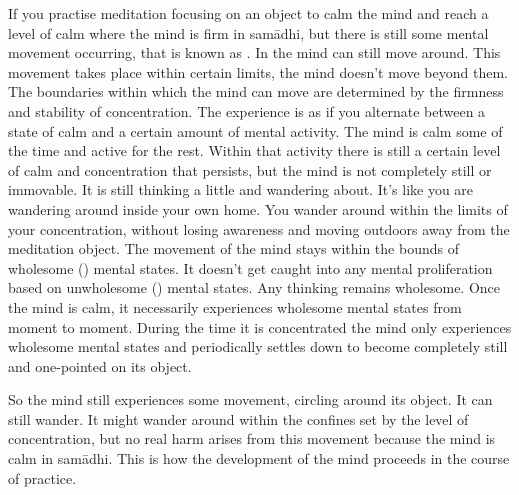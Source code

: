 If you practise meditation focusing on an object to calm the mind and reach a level of calm where the mind is firm in sam\=adhi, but there is still some mental movement occurring, that is known as . In  the mind can still move around. This movement takes place within certain limits, the mind doesn't move beyond them. The boundaries within which the mind can move are determined by the firmness and stability of concentration. The experience is as if you alternate between a state of calm and a certain amount of mental activity. The mind is calm some of the time and active for the rest. Within that activity there is still a certain level of calm and concentration that persists, but the mind is not completely still or immovable. It is still thinking a little and wandering about. It's like you are wandering around inside your own home. You wander around within the limits of your concentration, without losing awareness and moving outdoors away from the meditation object. The movement of the mind stays within the bounds of wholesome () mental states. It doesn't get caught into any mental proliferation based on unwholesome () mental states. Any thinking remains wholesome. Once the mind is calm, it necessarily experiences wholesome mental states from moment to moment. During the time it is concentrated the mind only experiences wholesome mental states and periodically settles down to become completely still and one-pointed on its object.

So the mind still experiences some movement, circling around its object. It can still wander. It might wander around within the confines set by the level of concentration, but no real harm arises from this movement because the mind is calm in sam\=adhi. This is how the development of the mind proceeds in the course of practice.

